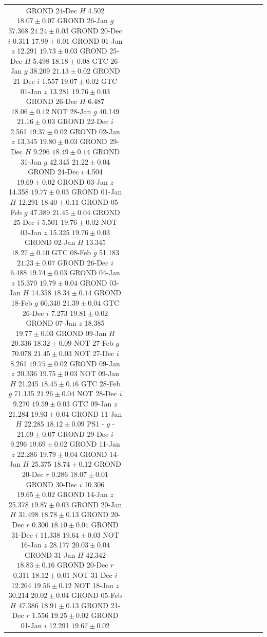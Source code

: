 \documentclass[traditabstract,longauth]{aa}
\begin{document}
\begin{appendix}
\begin{landscape}
\begin{table}
\begin{tabular}{ccccc|ccccc|ccccc|ccccc}
GROND		24-Dec		$H$		4.502		$	18.07	\pm	0.07	$	
GROND		26-Jan		$g$		37.368		$	21.24	\pm	0.03	$		
GROND		20-Dec		$i$		0.311		$	17.99	\pm	0.01	$		
GROND		01-Jan		$z$		12.291		$	19.73	\pm	0.03	$		
GROND		25-Dec		$H$		5.498		$	18.18	\pm	0.08	$	
GTC		26-Jan		$g$		38.209		$	21.13	\pm	0.02	$		
GROND		21-Dec		$i$		1.557		$	19.07	\pm	0.02	$		
GTC		01-Jan		$z$		13.281		$	19.76	\pm	0.03	$		
GROND		26-Dec		$H$		6.487		$	18.06	\pm	0.12	$	
NOT		28-Jan		$g$		40.149		$	21.16	\pm	0.03	$		
GROND		22-Dec		$i$		2.561		$	19.37	\pm	0.02	$		
GROND		02-Jan		$z$		13.345		$	19.80	\pm	0.03	$		
GROND		29-Dec		$H$		9.296		$	18.49	\pm	0.14	$	
GROND		31-Jan		$g$		42.345		$	21.22	\pm	0.04	$		
GROND		24-Dec		$i$		4.504		$	19.69	\pm	0.02	$		
GROND		03-Jan		$z$		14.358		$	19.77	\pm	0.03	$		
GROND		01-Jan		$H$		12.291		$	18.40	\pm	0.11	$	
GROND		05-Feb		$g$		47.389		$	21.45	\pm	0.04	$		
GROND		25-Dec		$i$		5.501		$	19.76	\pm	0.02	$		
NOT		03-Jan		$z$		15.325		$	19.76	\pm	0.03	$		
GROND		02-Jan		$H$		13.345		$	18.27	\pm	0.10	$	
GTC		08-Feb		$g$		51.183		$	21.23	\pm	0.07	$		
GROND		26-Dec		$i$		6.488		$	19.74	\pm	0.03	$		
GROND		04-Jan		$z$		15.370		$	19.79	\pm	0.04	$		
GROND		03-Jan		$H$		14.358		$	18.34	\pm	0.14	$	
GROND		18-Feb		$g$		60.340		$	21.39	\pm	0.04	$		
GTC		26-Dec		$i$		7.273		$	19.81	\pm	0.02	$		
GROND		07-Jan		$z$		18.385		$	19.77	\pm	0.03	$		
GROND		09-Jan		$H$		20.336		$	18.32	\pm	0.09	$	
NOT		27-Feb		$g$		70.078		$	21.45	\pm	0.03	$		
NOT		27-Dec		$i$		8.261		$	19.75	\pm	0.02	$		
GROND		09-Jan		$z$		20.336		$	19.75	\pm	0.03	$		
NOT		09-Jan		$H$		21.245		$	18.45	\pm	0.16	$	
GTC		28-Feb		$g$		71.135		$	21.26	\pm	0.04	$		
NOT		28-Dec		$i$		9.270		$	19.59	\pm	0.03	$		
GTC		09-Jan		$z$		21.284		$	19.93	\pm	0.04	$		
GROND		11-Jan		$H$		22.285		$	18.12	\pm	0.09	$	
PS1		-		$g$		-		$	21.69	\pm	0.07	$		
GROND		29-Dec		$i$		9.296		$	19.69	\pm	0.02	$		
GROND		11-Jan		$z$		22.286		$	19.79	\pm	0.04	$		
GROND		14-Jan		$H$		25.375		$	18.74	\pm	0.12	$	
GROND		20-Dec		$r$		0.286		$	18.07	\pm	0.01	$		
GROND		30-Dec		$i$		10.306		$	19.65	\pm	0.02	$		
GROND		14-Jan		$z$		25.378		$	19.87	\pm	0.03	$		
GROND		20-Jan		$H$		31.498		$	18.78	\pm	0.13	$	
GROND		20-Dec		$r$		0.300		$	18.10	\pm	0.01	$		
GROND		31-Dec		$i$		11.338		$	19.64	\pm	0.03	$		
NOT		16-Jan		$z$		28.177		$	20.03	\pm	0.04	$		
GROND		31-Jan		$H$		42.342		$	18.83	\pm	0.16	$	
GROND		20-Dec		$r$		0.311		$	18.12	\pm	0.01	$		
NOT		31-Dec		$i$		12.264		$	19.56	\pm	0.12	$		
NOT		18-Jan		$z$		30.214		$	20.02	\pm	0.04	$		
GROND		05-Feb		$H$		47.386		$	18.91	\pm	0.13	$	
GROND		21-Dec		$r$		1.556		$	19.25	\pm	0.02	$		
GROND		01-Jan		$i$		12.291		$	19.67	\pm	0.02	$		

\end{tabular}
\end{table}
\end{landscape}
\end{appendix}
\end{document}
